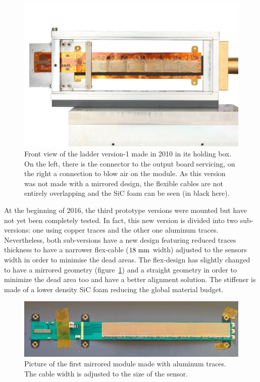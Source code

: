     \begin{figure}[!tbh]
      \centering
      \includegraphics[width = 12 cm]{Pictures/vxd/plume_ladder2010_frontView}
      \caption{Front view of the ladder version-1 made in 2010 in its holding box. On the left, there is the connector to the output board servicing, on the right a connection to blow air on the module. As this version was not made with a mirrored design, the flexible cables are not entirely overlapping and the SiC foam can be seen (in black here).}
    \end{figure}

    At the beginning of 2016, the third prototype versions were mounted but have not yet been completely tested.
    In fact, this new version is divided into two sub-versions: one using copper traces and the other one aluminum traces.
    Nevertheless, both sub-versions have a new design featuring reduced traces thickness to have a narrower flex-cable ($18~\rm{mm}$ width) adjusted to the sensors width in order to minimise the dead areas.
    The flex-design has slightly changed to have a mirrored geometry (figure~\ref{fig:AM01}) and a straight geometry in order to minimize the dead area too and have a better alignment solution.
    The stiffener is made of a lower density \gls{SiC} foam reducing the global material budget. 

    \begin{figure}[!tbh]
      \centering
      \includegraphics[width = 12cm]{Pictures/vxd/AM01.jpg}
      \caption{Picture of the first mirrored module made with aluminum traces. The cable width is adjusted to the size of the sensor.}
      \label{fig:AM01}
    \end{figure}
    
